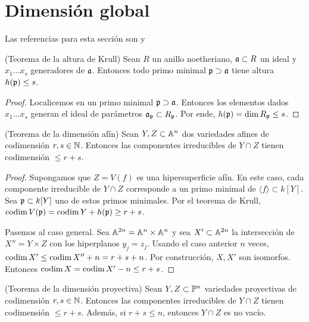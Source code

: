 \section{Dimensión global}

\noindent Las referencias para esta sección son \cite[pp. 121-125]{atiyah} y \cite[pp. 47-49, 51-52]{hartshorne}

\begin{proposition}
(Teorema de la altura de Krull) Sean $R$ un anillo noetheriano, $\a \subset R$ un ideal y $x_1 \dots x_s$ generadores de $\a$. Entonces todo primo minimal $\p \supset \a$ tiene altura $h(\p) \le s$.
\end{proposition}

\begin{proof}
Localicemos en un primo minimal $\p \supset \a$. Entonces los elementos dados $x_1 \dots x_s$ generan el ideal de parámetros $\a_\p \subset R_\p$. Por ende, $h(\p) = \dim R_\p \le s$.
\end{proof}

\begin{proposition}
(Teorema de la dimensión afín) Sean $Y, Z \subset \A^n$ dos variedades afines de codimensión $r, s \in \N$. Entonces las componentes irreducibles de $Y \cap Z$ tienen codimensión $\le r + s$.
\end{proposition}

\begin{proof}
Supongamos que $Z = V(f)$ es una hipersuperficie afín. En este caso, cada componente irreducible de $Y \cap Z$ corresponde a un primo minimal de $\langle f \rangle \subset k[Y]$. Sea $\p \subset k[Y]$ uno de estos primos minimales. Por el teorema de Krull, $\codim V(\p) = \codim Y + h(\p) \ge r + s$.

Pasemos al caso general. Sea $\A^{2n} = \A^n \times \A^n$ y sea $X' \subset \A^{2n}$ la intersección de $X'' = Y \times Z$ con los hiperplanos $y_j = z_j$. Usando el caso anterior $n$ veces, $\codim X' \le \codim X'' + n = r + s + n$. Por construcción, $X, X'$ son isomorfos. Entonces $\codim X = \codim X' - n \le r + s$.
\end{proof}

\begin{theorem}
(Teorema de la dimensión proyectiva) Sean $Y, Z \subset \P^n$ variedades proyectivas de codimensión $r, s \in \N$. Entonces las componentes irreducibles de $Y \cap Z$ tienen codimensión $\le r + s$. Además, si $r + s \le n$, entonces $Y \cap Z$ es no vacío.
\end{theorem}

